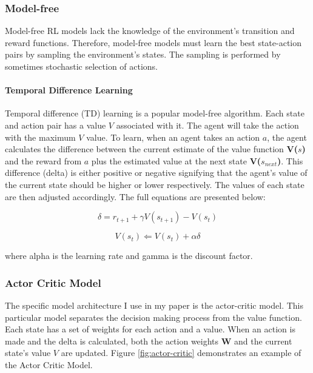 \subsubsection{Model-free}
Model-free RL models lack the knowledge of the environment's transition and reward functions. Therefore, model-free models must learn the best state-action pairs by sampling the environment's states. The sampling is performed by sometimes stochastic selection of actions.
 
\paragraph{Temporal Difference Learning}
Temporal difference (TD) learning is a popular model-free algorithm. Each state and action pair has a value $V$ associated with it. The agent will take the action with the maximum $V$ value. To learn, when an agent takes an action $a$, the agent calculates the difference between the current estimate of the value function \textbf{V($s$)} and the reward from $a$ plus the estimated value at the next state \textbf{V($s_{next}$)}. This difference (delta) is either positive or negative signifying that the agent's value of the current state should be higher or lower respectively. The values of each state are then adjusted accordingly. The full equations are presented below: 

\begin{equation}\delta = r_{t+1} + \gamma V(s_{t+1}) - V(s_{t})\end{equation}

\begin{equation}V(s_t) \Longleftarrow V(s_t) + \alpha\delta\end{equation}

where alpha is the learning rate and gamma is the discount factor.

\subsubsection{Actor Critic Model}
The specific model architecture I use in my paper is the actor-critic model. This particular model separates the decision making process from the value function. Each state has a set of weights for each action and a value. When an action is made and the delta is calculated, both the action weights \textbf{W} and the current state's value $V$ are updated. Figure \ref{fig:actor-critic} demonstrates an example of the Actor Critic Model.



